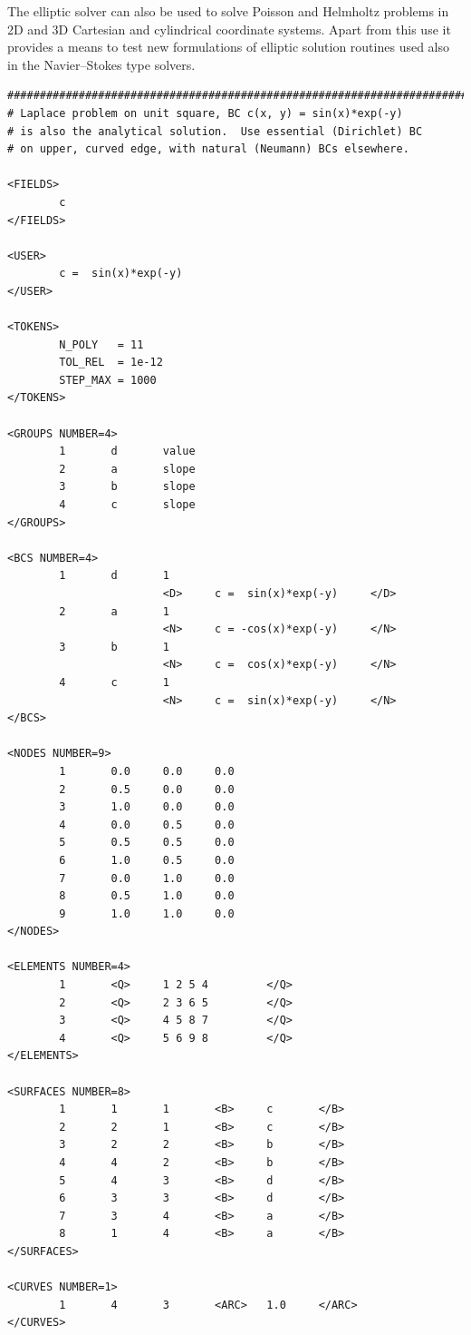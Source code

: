 \documentclass[11pt,a4paper]{report}
\begin{document}
The elliptic solver can also be used to solve Poisson and Helmholtz
problems in 2D and 3D Cartesian and cylindrical coordinate systems.
Apart from this use it provides a means to test new formulations of
elliptic solution routines used also in the Navier--Stokes type
solvers.

{\small
\begin{verbatim}
##############################################################################
# Laplace problem on unit square, BC c(x, y) = sin(x)*exp(-y)
# is also the analytical solution.  Use essential (Dirichlet) BC
# on upper, curved edge, with natural (Neumann) BCs elsewhere.

<FIELDS>
        c
</FIELDS>

<USER>
        c =  sin(x)*exp(-y)
</USER>

<TOKENS>
        N_POLY   = 11
        TOL_REL  = 1e-12
        STEP_MAX = 1000
</TOKENS>

<GROUPS NUMBER=4>
        1       d       value
        2       a       slope
        3       b       slope
        4       c       slope
</GROUPS>

<BCS NUMBER=4>
        1       d       1
                        <D>     c =  sin(x)*exp(-y)     </D>
        2       a       1
                        <N>     c = -cos(x)*exp(-y)     </N>
        3       b       1
                        <N>     c =  cos(x)*exp(-y)     </N>
        4       c       1
                        <N>     c =  sin(x)*exp(-y)     </N>
</BCS>

<NODES NUMBER=9>
        1       0.0     0.0     0.0
        2       0.5     0.0     0.0
        3       1.0     0.0     0.0
        4       0.0     0.5     0.0
        5       0.5     0.5     0.0
        6       1.0     0.5     0.0
        7       0.0     1.0     0.0
        8       0.5     1.0     0.0
        9       1.0     1.0     0.0
</NODES>

<ELEMENTS NUMBER=4>
        1       <Q>     1 2 5 4         </Q>
        2       <Q>     2 3 6 5         </Q>
        3       <Q>     4 5 8 7         </Q>
        4       <Q>     5 6 9 8         </Q>
</ELEMENTS>

<SURFACES NUMBER=8>
        1       1       1       <B>     c       </B>
        2       2       1       <B>     c       </B>
        3       2       2       <B>     b       </B>
        4       4       2       <B>     b       </B>
        5       4       3       <B>     d       </B>
        6       3       3       <B>     d       </B>
        7       3       4       <B>     a       </B>
        8       1       4       <B>     a       </B>
</SURFACES>

<CURVES NUMBER=1>
        1       4       3       <ARC>   1.0     </ARC>
</CURVES>
\end{verbatim}
}
\end{document}
